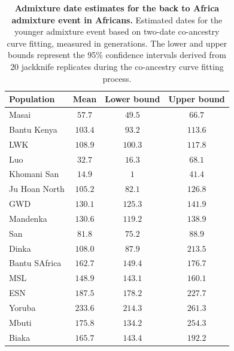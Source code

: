 \begin{table}[h!]
    \centering
\caption{\textbf{Admixture date estimates for the back to Africa admixture event in Africans.} Estimated dates for the younger admixture event based on two-date co-ancestry curve fitting, measured in generations. The lower and upper bounds represent the 95\% confidence intervals derived from 20 jackknife replicates during the co-ancestry curve fitting process.}
\label{tab:gb_bta_admix_dates}
    \begin{tabular}{|l|c|c|c|} \hline 
         \textbf{Population}&  \textbf{Mean}&  \textbf{Lower bound}& \textbf{Upper bound}\\ \hline 
         Masai&  $57.7$&  $49.5$& $66.7$\\ \hline 
         Bantu Kenya&  $103.4$&  $93.2$& $113.6$\\ \hline 
         LWK&  $108.9$&  $100.3$& $117.8$\\ \hline 
         Luo&  $32.7$&  $16.3$& $68.1$\\ \hline 
         Khomani San&  $14.9$&  $1$& $41.4$\\ \hline 
         Ju Hoan North&  $105.2$&  $82.1$& $126.8$\\ \hline 
         GWD&  $130.1$&  $125.3$& $141.9$\\ \hline 
         Mandenka&  $130.6$&  $119.2$&$138.9$\\ \hline 
         San&  $81.8$&  $75.2$& $88.9$\\ \hline
         Dinka& $108.0$& $87.9$&$213.5$\\\hline
         Bantu SAfrica& $162.7$& $149.4$&$176.7$\\\hline
         MSL& $148.9$& $143.1$&$160.1$\\\hline
         ESN& $187.5$& $178.2$&$227.7$\\\hline
         Yoruba& $233.6$& $214.3$&$261.3$\\\hline
         Mbuti& $175.8$& $134.2$&$254.3$\\\hline
         Biaka& $165.7$& $143.4$&$192.2$\\\hline
    \end{tabular} 
\end{table}

